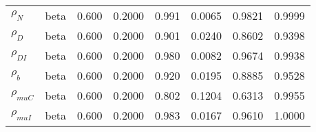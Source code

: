 \begin{center}
\begin{longtable}{llcccccc}
${\rho_N}$ & beta &   0.600 & 0.2000 &   0.991& 0.0065 &  0.9821 &  0.9999 \\ 
${\rho_D}$ & beta &   0.600 & 0.2000 &   0.901& 0.0240 &  0.8602 &  0.9398 \\ 
${\rho_{DI}}$ & beta &   0.600 & 0.2000 &   0.980& 0.0082 &  0.9674 &  0.9938 \\ 
${\rho_b}$ & beta &   0.600 & 0.2000 &   0.920& 0.0195 &  0.8885 &  0.9528 \\ 
${\rho_{muC}}$ & beta &   0.600 & 0.2000 &   0.802& 0.1204 &  0.6313 &  0.9955 \\ 
${\rho_{muI}}$ & beta &   0.600 & 0.2000 &   0.983& 0.0167 &  0.9610 &  1.0000 \\ 
\end{longtable}
 \end{center}
